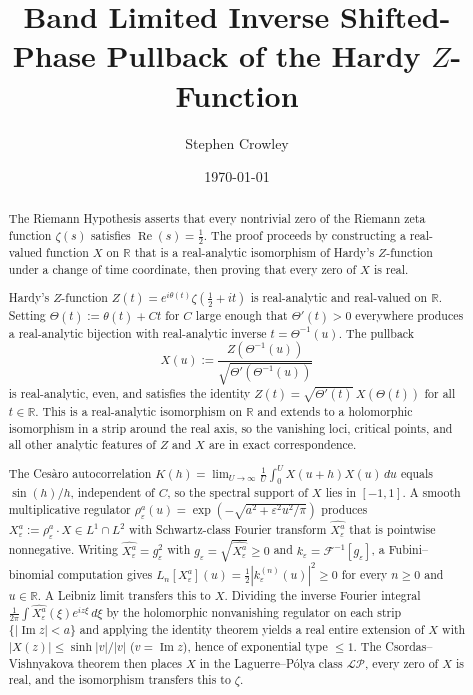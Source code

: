 \documentclass[12pt]{amsart}
\title{Band Limited Inverse Shifted-Phase Pullback of the Hardy $Z$-Function}
\author{Stephen Crowley}
\date{\today}
\theoremstyle{remark}
\begin{document}
\maketitle

\begin{abstract}
The Riemann Hypothesis asserts that every nontrivial zero of the
Riemann zeta function $\zeta(s)$ satisfies $\operatorname{Re}(s)=\tfrac12$.
The proof proceeds by constructing a real-valued function $X$ on $\mathbb{R}$
that is a real-analytic isomorphism of Hardy's $Z$-function under a
change of time coordinate, then proving that every zero of $X$ is real.

Hardy's $Z$-function $Z(t)=e^{i\theta(t)}\zeta(\tfrac12+it)$ is
real-analytic and real-valued on $\mathbb{R}$.  Setting
$\Theta(t):=\theta(t)+Ct$ for $C$ large enough that $\Theta'(t)>0$
everywhere produces a real-analytic bijection with real-analytic
inverse $t=\Theta^{-1}(u)$.  The pullback
\[
  X(u):=\frac{Z(\Theta^{-1}(u))}{\sqrt{\Theta'(\Theta^{-1}(u))}}
\]
is real-analytic, even, and satisfies the identity
$Z(t)=\sqrt{\Theta'(t)}\,X(\Theta(t))$ for all $t\in\mathbb{R}$.
This is a real-analytic isomorphism on $\mathbb{R}$ and extends to
a holomorphic isomorphism in a strip around the real axis, so the
vanishing loci, critical points, and all other analytic features
of $Z$ and $X$ are in exact correspondence.

The Ces\`aro autocorrelation
$K(h)=\lim_{U\to\infty}\frac{1}{U}\int_0^U X(u+h)X(u)\,du$
equals $\sin(h)/h$, independent of $C$, so the spectral support of
$X$ lies in $[-1,1]$.  A smooth multiplicative regulator
$\rho_\varepsilon^a(u)=\exp(-\sqrt{a^2+\varepsilon^2u^2/\pi})$
produces $X_\varepsilon^a:=\rho_\varepsilon^a\cdot X\in L^1\cap L^2$
with Schwartz-class Fourier transform $\widehat{X_\varepsilon^a}$
that is pointwise nonnegative.  Writing $\widehat{X_\varepsilon^a}=g_\varepsilon^2$
with $g_\varepsilon=\sqrt{\widehat{X_\varepsilon^a}}\geq 0$ and
$k_\varepsilon=\mathcal{F}^{-1}[g_\varepsilon]$, a Fubini--binomial
computation gives $L_n[X_\varepsilon^a](u)=\tfrac12|k_\varepsilon^{(n)}(u)|^2\geq 0$
for every $n\geq 0$ and $u\in\mathbb{R}$.  A Leibniz limit
transfers this to $X$.  Dividing the inverse Fourier integral
$\frac{1}{2\pi}\int\widehat{X_\varepsilon^a}(\xi)e^{iz\xi}\,d\xi$
by the holomorphic nonvanishing regulator on each strip
$\{|\operatorname{Im}z|<a\}$ and applying the identity theorem
yields a real entire extension of $X$ with $|X(z)|\leq\sinh|v|/|v|$
($v=\operatorname{Im}z$), hence of exponential type $\leq 1$.
The Csordas--Vishnyakova theorem then places $X$ in the
Laguerre--P\'olya class $\mathcal{LP}$, every zero of $X$ is real,
and the isomorphism transfers this to $\zeta$.
\end{abstract}
\end{document}
